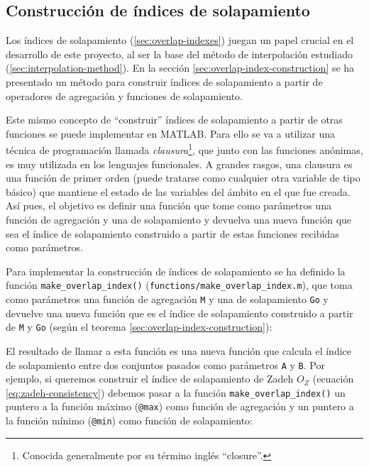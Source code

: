 \subsection{Construcción de índices de solapamiento}
Los índices de solapamiento (\ref{sec:overlap-indexes}) juegan un papel crucial en el desarrollo de este proyecto, al ser la base del método de interpolación estudiado (\ref{sec:interpolation-method}). En la sección \ref{sec:overlap-index-construction} se ha presentado un método para construir índices de solapamiento a partir de operadores de agregación y funciones de solapamiento. 

Este mismo concepto de ``construir'' índices de solapamiento a partir de otras funciones se puede implementar en MATLAB. Para ello se va a utilizar una técnica de programación llamada \emph{clausura}\footnote{Conocida generalmente por su término inglés ``closure''.}, que junto con las funciones anónimas, es muy utilizada en los lenguajes funcionales. A grandes rasgos, una clausura es una función de primer orden (puede tratarse como cualquier otra variable de tipo básico) que mantiene el estado de las variables del ámbito en el que fue creada. Así pues, el objetivo es definir una función que tome como parámetros una función de agregación y una de solapamiento y devuelva una nueva función que sea el índice de solapamiento construido a partir de estas funciones recibidas como parámetros.

Para implementar la construcción de índices de solapamiento se ha definido la función \lstinline|make_overlap_index()| (\lstinline|functions/make_overlap_index.m|), que toma como parámetros una función de agregación \lstinline|M| y una de solapamiento \lstinline|Go| y devuelve una nueva función que es el índice de solapamiento construido a partir de \lstinline|M| y 
\lstinline|Go| (según el teorema \ref{sec:overlap-index-construction}):



El resultado de llamar a esta función es una nueva función que calcula el índice de solapamiento entre dos conjuntos pasados como parámetros \lstinline|A| y \lstinline|B|. Por ejemplo, si queremos construir el índice de solapamiento de Zadeh $O_Z$ (ecuación \ref{eq:zadeh-consistency}) debemos pasar a la función \lstinline|make_overlap_index()| un puntero a la función máximo (\lstinline|@max|) como función de agregación y un puntero a la función mínimo (\lstinline|@min|) como función de solapamiento:

